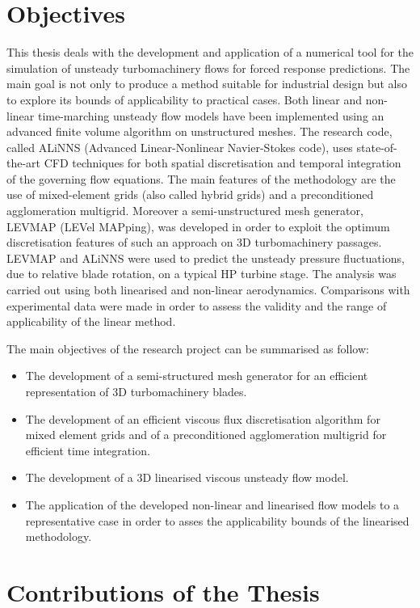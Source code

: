%
%
%
%
%
\section{Objectives}
\label{objective.sec}
%
 This thesis deals with the development and application of a numerical
 tool for the simulation of unsteady turbomachinery flows for forced response
 predictions. The main goal is not only to produce a method suitable
 for industrial design but also to explore its bounds of applicability to
 practical cases.
 Both linear and non-linear time-marching unsteady flow models 
 have been implemented using an advanced finite volume algorithm on
 unstructured meshes.
 The research code, called ALiNNS (Advanced Linear-Nonlinear Navier-Stokes code),
 uses state-of-the-art CFD techniques for both spatial discretisation and temporal
 integration of the governing flow equations. The main features
 of the methodology are the use of mixed-element grids (also called hybrid grids)
 and a preconditioned agglomeration multigrid.
 Moreover a semi-unstructured mesh generator, LEVMAP (LEVel MAPping), was developed in order
 to exploit the optimum discretisation features of such an approach on 3D
 turbomachinery passages.
 LEVMAP and ALiNNS were used to predict the unsteady pressure fluctuations,
 due to relative blade rotation, on a typical HP turbine stage.
 The analysis was carried out using both linearised and non-linear aerodynamics.
 Comparisons with experimental data were made
 in order to assess the validity and the range of applicability of the linear
 method.

 The main objectives of the research project can be summarised as follow:
%
\begin{itemize}
%
\item
 The development of a semi-structured mesh generator for an efficient representation
 of 3D turbomachinery blades.
%
\item
 The development of an efficient viscous flux discretisation algorithm for
 mixed element grids and of a preconditioned agglomeration multigrid for
 efficient time integration.
%
\item
 The development of a 3D linearised viscous unsteady flow model.
%
\item
 The application of the developed non-linear and linearised flow models
 to a representative case in order to asses the applicability bounds
 of the linearised methodology.
%
\end{itemize}
%
%
\section{Contributions of the Thesis}
\label{contributions.sec}
%
